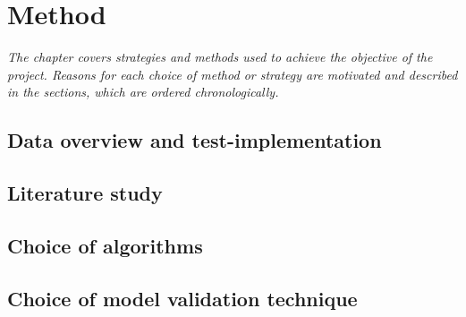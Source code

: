 \chapter{Method}
\emph{The chapter covers strategies and methods used to achieve the objective of the project. Reasons for each choice of method or strategy are motivated and described in the sections, which are ordered chronologically.}





\section{Data overview and test-implementation}

\section{Literature study}

\section{Choice of algorithms}

\section{Choice of model validation technique}
